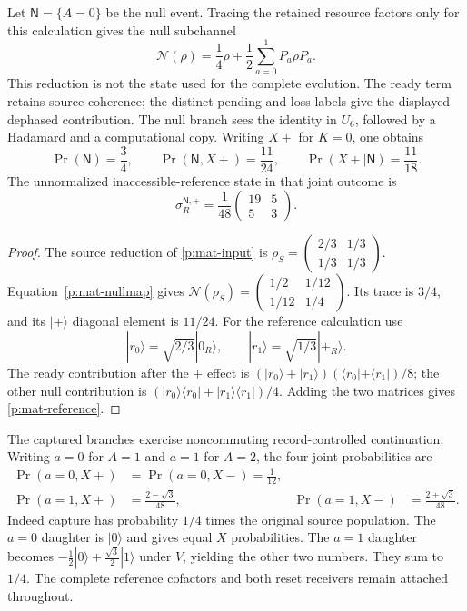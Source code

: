 \documentclass[11pt,oneside,openany]{book}
\theoremstyle{definition}
\theoremstyle{remark}\newtheorem{remark}[theorem]{Remark}
\begin{document}
Let $\mathsf N=\{A=0\}$ be the null event.  Tracing the retained resource
factors only for this calculation gives the null subchannel
\begin{equation}\label{p:mat-nullmap}
 \mathcal N(\rho)=\frac14\rho+
          \frac12\sum_{a=0}^1P_a\rho P_a.
\end{equation}
This reduction is not the state used for the complete evolution.
The ready term retains source coherence; the distinct pending and
loss labels give the displayed dephased contribution.  The null
branch sees the identity in $U_6$, followed by a Hadamard and a
computational copy.  Writing $X+$ for $K=0$, one obtains
\begin{equation}\label{p:mat-nullnumbers}
 \Pr(\mathsf N)=\frac34,\qquad
 \Pr(\mathsf N,X+)=\frac{11}{24},\qquad
 \Pr(X+\mid\mathsf N)=\frac{11}{18}.
\end{equation}
The unnormalized inaccessible-reference state in that joint outcome is
\begin{equation}\label{p:mat-reference}
 \sigma_R^{\mathsf N,+}=\frac1{48}
       \begin{pmatrix}19&5\\5&3\end{pmatrix}.
\end{equation}
\begin{proof}
The source reduction of \eqref{p:mat-input} is
$\rho_S=\left(\begin{smallmatrix}2/3&1/3\\1/3&1/3\end{smallmatrix}\right)$.
Equation~\eqref{p:mat-nullmap} gives
$\mathcal N(\rho_S)=\left(\begin{smallmatrix}1/2&1/12\\1/12&1/4\end{smallmatrix}\right)$.
Its trace is $3/4$, and its $|+\rangle$ diagonal element is $11/24$.
For the reference calculation use
\[
 |r_0\rangle=\sqrt{2/3}|0_R\rangle,
 \qquad |r_1\rangle=\sqrt{1/3}|+_R\rangle.
\]
The ready contribution after the $+$ effect is
$(|r_0\rangle+|r_1\rangle)(\langle r_0|+\langle r_1|)/8$;
the other null contribution is
$(|r_0\rangle\langle r_0|+|r_1\rangle\langle r_1|)/4$.
Adding the two matrices gives \eqref{p:mat-reference}.
\end{proof}

The captured branches exercise noncommuting record-controlled
continuation.  Writing $a=0$ for $A=1$ and $a=1$ for $A=2$, the
four joint probabilities are
\begin{align}\label{p:mat-capturednumbers}
 \Pr(a=0,X+)&=\Pr(a=0,X-)=\frac1{12},\\
 \Pr(a=1,X+)&=\frac{2-\sqrt3}{48},&
 \Pr(a=1,X-)&=\frac{2+\sqrt3}{48}.\nonumber
\end{align}
Indeed capture has probability $1/4$ times the original source
population.  The $a=0$ daughter is $|0\rangle$ and gives equal $X$
probabilities.  The $a=1$ daughter becomes
$-\tfrac12|0\rangle+\tfrac{\sqrt3}{2}|1\rangle$ under $V$, yielding
the other two numbers.  They sum to $1/4$.  The complete reference
cofactors and both reset receivers remain attached throughout.
\end{document}
